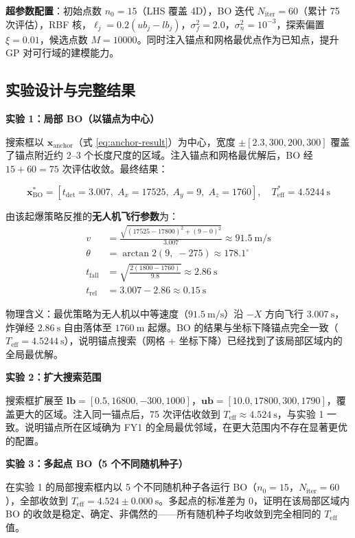 \documentclass[12pt,a4paper]{ctexart}
\newcommand{\tdet}{t_{\text{det}}}
\newcommand{\Teff}{T_{\text{eff}}}
\begin{document}
\textbf{超参数配置}：初始点数 $n_0 = 15$（LHS 覆盖 4D），BO 迭代 $N_{\text{iter}} = 60$（累计 75 次评估），RBF 核，$\ell_j = 0.2(ub_j - lb_j)$，$\sigma_f^2 = 2.0$，$\sigma_n^2 = 10^{-3}$，探索偏置 $\xi = 0.01$，候选点数 $M = 10000$。同时注入锚点和网格最优点作为已知点，提升 GP 对可行域的建模能力。

\subsection{实验设计与完整结果}

\textbf{实验 1：局部 BO（以锚点为中心）}

搜索框以 $\mathbf{x}_{\text{anchor}}$（式 \ref{eq:anchor-result}）为中心，宽度 $\pm[2.3, 300, 200, 300]$ 覆盖了锚点附近约 2--3 个长度尺度的区域。注入锚点和网格最优解后，BO 经 $15+60=75$ 次评估收敛。最终结果：

\begin{equation}
\boxed{\mathbf{x}^*_{\text{BO}} = [\tdet = 3.007,\; A_x = 17525,\; A_y = 9,\; A_z = 1760], \quad \Teff^* = 4.5244\ \mathrm{s}}
\end{equation}

由该起爆策略反推的\textbf{无人机飞行参数}为：
\begin{align}
v &= \frac{\sqrt{(17525-17800)^2 + (9-0)^2}}{3.007} \approx 91.5\ \mathrm{m/s} \\
\theta &= \arctan2(9,\; -275) \approx 178.1^\circ \\
t_{\text{fall}} &= \sqrt{\frac{2(1800-1760)}{9.8}} \approx 2.86\ \mathrm{s} \\
t_{\text{rel}} &= 3.007 - 2.86 \approx 0.15\ \mathrm{s}
\end{align}

物理含义：最优策略为无人机以中等速度（$91.5\ \mathrm{m/s}$）沿 $-X$ 方向飞行 $3.007\ \mathrm{s}$，炸弹经 $2.86\ \mathrm{s}$ 自由落体至 $1760\ \mathrm{m}$ 起爆。BO 的结果与坐标下降锚点完全一致（$\Teff = 4.5244\ \mathrm{s}$），说明锚点搜索（网格 + 坐标下降）已经找到了该局部区域内的全局最优解。

\textbf{实验 2：扩大搜索范围}

搜索框扩展至 $\mathbf{lb} = [0.5, 16800, -300, 1000]$，$\mathbf{ub} = [10.0, 17800, 300, 1790]$，覆盖更大的区域。注入同一锚点后，75 次评估收敛到 $\Teff \approx 4.524\ \mathrm{s}$，与实验 1 一致。说明锚点所在区域确为 FY1 的全局最优邻域，在更大范围内不存在显著更优的配置。

\textbf{实验 3：多起点 BO（5 个不同随机种子）}

在实验 1 的局部搜索框内以 5 个不同随机种子各运行 BO（$n_0=15$，$N_{\text{iter}}=60$），全部收敛到 $\Teff = 4.524 \pm 0.000\ \mathrm{s}$。多起点的标准差为 0，证明在该局部区域内 BO 的收敛是稳定、确定、非偶然的——所有随机种子均收敛到完全相同的 $\Teff$ 值。
\end{document}
